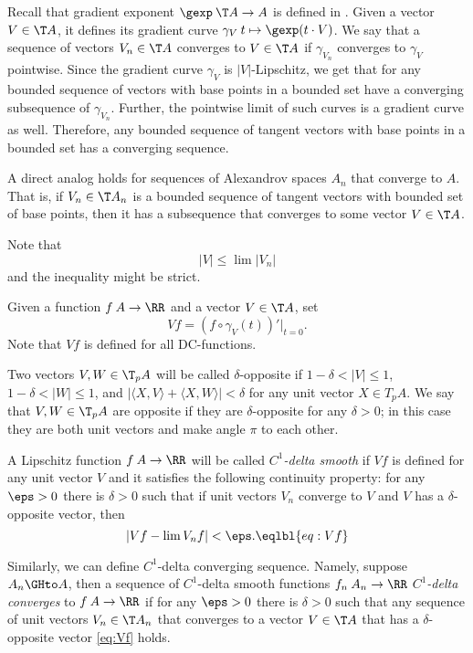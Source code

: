 Recall that gradient exponent $\gexp\: \T A\to A$ is defined in \cite{AKP}.
Given a vector $V\in \T A$, it defines its gradient curve $\gamma_{V}\:t\mapsto \gexp (t\cdot V)$.
We say that a sequence of vectors $V_n\in \T A$ converges to $V\in \T A$ if $\gamma_{V_n}$ converges to $\gamma_V$ pointwise.
Since the gradient curve $\gamma_V$ is $|V|$-Lipschitz, we get that for any bounded sequence of vectors with base points in a bounded set have a converging subsequence of $\gamma_{V_n}$.
Further, the pointwise limit of such curves is a gradient curve as well.
Therefore, any bounded sequence of tangent vectors with base points in a bounded set has a converging sequence.

A direct analog holds for sequences of Alexandrov spaces $A_n$ that converge to $A$.
That is, if $V_n\in \T A_n$ is a bounded sequence of tangent vectors with bounded set of base points, then it has a subsequence that converges to some vector $V\in \T A$.

Note that 
\[|V|\le \lim |V_n|\]
and the inequality might be strict.




Given a function $f\:A\to \RR$ and a vector $V\in \T A$, set
\[Vf=(f\circ\gamma_V(t))'|_{t=0}.\]
Note that $Vf$ is defined for all DC-functions.

Two vectors $V,W\in \T_pA$ will be called $\delta$-opposite if
$1-\delta< |V|\le 1$,
$1-\delta< |W|\le 1$,
and $|\langle X,V\rangle +\langle X,W\rangle|<\delta$ for any unit vector $X\in T_p A$.
We say that $V,W\in \T_pA$ are opposite if they are $\delta$-opposite for any $\delta>0$;
in this case they are both unit vectors and make angle $\pi$ to each other.  

A Lipschitz function $f\:A\to \RR$ will be called \emph{$C^1$-delta smooth} if $Vf$ is defined for any unit vector $V$ and it satisfies the following continuity property:
for any $\eps>0$ there is $\delta>0$ such that if unit vectors $V_n$ converge to $V$ and $V$ has a $\delta$-opposite vector, then 
\[|Vf-\lim V_nf|<\eps.\eqlbl{eq:Vf}\]

Similarly, we can define $C^1$-delta converging sequence. Namely, suppose $A_n\GHto A$, then a sequence of $C^1$-delta smooth functions $f_n\:A_n\to\RR$ \emph{$C^1$-delta converges} to $f\:A\to \RR$ if for any $\eps>0$ there is $\delta>0$ such that any sequence of unit vectors $V_n\in \T A_n$ that converges to a vector $V\in \T A$ that has a $\delta$-opposite vector \ref{eq:Vf} holds. 

